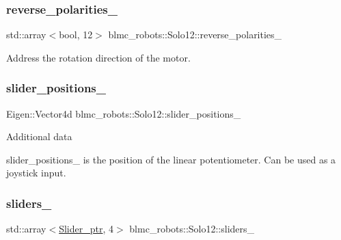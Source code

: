 \subsubsection{\texorpdfstring{reverse\+\_\+polarities\+\_\+}{reverse\_polarities\_}}
{\footnotesize\ttfamily std\+::array$<$bool, 12$>$ blmc\+\_\+robots\+::\+Solo12\+::reverse\+\_\+polarities\+\_\+\hspace{0.3cm}{\ttfamily [private]}}



Address the rotation direction of the motor. 

\mbox{\label{classblmc__robots_1_1Solo12_a67948750642c1e62f4aeadb4adac3bdd}} 
\subsubsection{\texorpdfstring{slider\+\_\+positions\+\_\+}{slider\_positions\_}}
{\footnotesize\ttfamily Eigen\+::\+Vector4d blmc\+\_\+robots\+::\+Solo12\+::slider\+\_\+positions\+\_\+\hspace{0.3cm}{\ttfamily [private]}}





 Additional data 

slider\+\_\+positions\+\_\+ is the position of the linear potentiometer. Can be used as a joystick input. \mbox{\label{classblmc__robots_1_1Solo12_a4119af8c0b732d5559f8d71a9714ac29}} 
\subsubsection{\texorpdfstring{sliders\+\_\+}{sliders\_}}
{\footnotesize\ttfamily std\+::array$<$\hyperlink{common__header_8hpp_a4cb9a95e8b2c0bf237ce29f5252c7b73}{Slider\+\_\+ptr}, 4$>$ blmc\+\_\+robots\+::\+Solo12\+::sliders\+\_\+\hspace{0.3cm}{\ttfamily [private]}}



